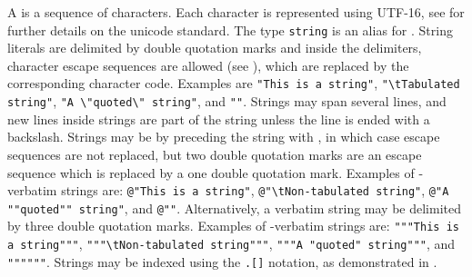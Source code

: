 A  is a sequence of characters. Each character is represented using UTF-16, see  for further details on the unicode standard. The type \lstinline{string} is an alias for . String literals are delimited by double quotation marks  and inside the delimiters, character escape sequences are allowed (see ), which are replaced by the corresponding character code. Examples are \lstinline{"This is a string"}, \lstinline{"\tTabulated string"}, \lstinline{"A \"quoted\" string"}, and \lstinline{""}. Strings may span several lines, and new lines inside strings are part of the string unless the line is ended with a backslash. Strings may be  by preceding the string with , in which case escape sequences are not replaced, but two double quotation marks are an escape sequence which is replaced by a one double quotation mark. Examples of -verbatim strings are: \lstinline{@"This is a string"}, \lstinline{@"\tNon-tabulated string"}, \lstinline{@"A ""quoted"" string"}, and \lstinline{@""}. Alternatively, a verbatim string may be delimited by three double quotation marks. Examples of -verbatim strings are: \lstinline{"""This is a string"""}, \lstinline{"""\tNon-tabulated string"""}, \lstinline{"""A "quoted" string"""}, and \lstinline{""""""}. Strings may be indexed using the \lstinline{.[]} notation, as demonstrated in .

